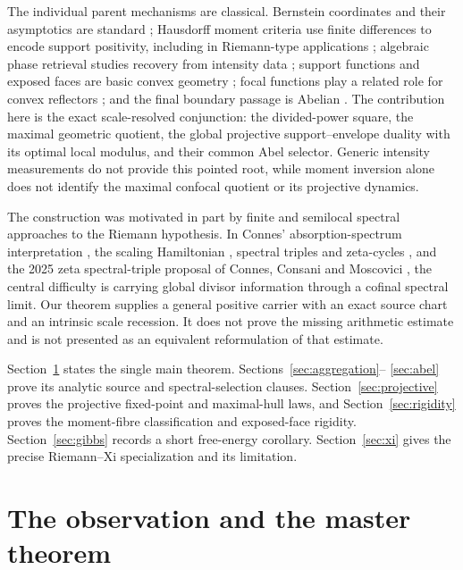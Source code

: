 \documentclass[11pt]{article}
\theoremstyle{remark}
\begin{document}
The individual parent mechanisms are classical.  Bernstein coordinates and their asymptotics
are standard \cite{LorentzBernstein}; Hausdorff moment criteria use finite differences to encode
support positivity, including in Riemann-type applications \cite{Zhang2023}; algebraic phase
retrieval studies recovery from intensity data \cite{ConcaEdidinHeringVinzant2015}; support
functions and exposed faces are basic convex geometry \cite{SchneiderConvexBodies}; focal
functions play a related role for convex reflectors \cite{Oliker2008}; and the final boundary
passage is Abelian \cite{HardyDivergentSeries}.  The contribution here is the exact
scale-resolved conjunction: the divided-power square, the maximal geometric quotient, the global
projective support--envelope duality with its optimal local modulus, and their common Abel selector.
Generic intensity measurements do not provide this pointed root, while moment inversion alone
does not identify the maximal confocal quotient or its projective dynamics.

The construction was motivated in part by finite and semilocal spectral approaches to the
Riemann hypothesis.  In Connes' absorption-spectrum interpretation \cite{Connes1999}, the scaling
Hamiltonian \cite{ConnesConsani2020}, spectral triples and zeta-cycles
\cite{ConnesConsani2023}, and the 2025 zeta spectral-triple proposal of Connes, Consani and
Moscovici \cite{ConnesConsaniMoscovici2025}, the central difficulty is carrying global divisor
information through a cofinal spectral limit.  Our theorem supplies a general positive carrier
with an exact source chart and an intrinsic scale recession.  It does not prove the missing
arithmetic estimate and is not presented as an equivalent reformulation of that estimate.

Section~\ref{sec:setup} states the single main theorem.  Sections~\ref{sec:aggregation}--
\ref{sec:abel} prove its analytic source and spectral-selection clauses.
Section~\ref{sec:projective} proves the projective fixed-point and maximal-hull laws, and
Section~\ref{sec:rigidity} proves the moment-fibre classification and exposed-face rigidity.
Section~\ref{sec:gibbs} records a short
free-energy corollary.  Section~\ref{sec:xi} gives the precise Riemann--Xi specialization and its
limitation.

\section{The observation and the master theorem}
\label{sec:setup}
\end{document}
